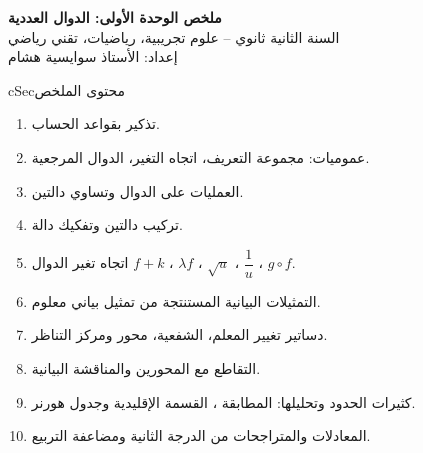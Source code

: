 \documentclass[12pt,a4paper]{article}
\newenvironment{BOX}[2]{\begin{otherlanguage}{english}\begin{arbox}{#1}{#2}}{\end{arbox}\end{otherlanguage}}
\newenvironment{LTR}{\begin{otherlanguage}{english}}{\end{otherlanguage}}
\begin{document}
\begin{LTR}
\begin{tcolorbox}[enhanced,colback=cSec,colframe=cSec,arc=3mm,halign=center,
  boxrule=0pt,top=10pt,bottom=10pt,before upper={\selectlanguage{arabic}}]
{\color{white}\Huge\bfseries ملخص الوحدة الأولى: الدوال العددية}\\[6pt]
{\color{white}\large السنة الثانية ثانوي -- علوم تجريبية، رياضيات، تقني رياضي}\\[4pt]
{\color{white!85!cSec}\normalsize إعداد: الأستاذ سوايسية هشام}
\end{tcolorbox}
\end{LTR}

\begin{BOX}{cSec}{محتوى الملخص}
\begin{enumerate}
\item تذكير بقواعد الحساب.
\item عموميات: مجموعة التعريف، اتجاه التغير، الدوال المرجعية.
\item العمليات على الدوال وتساوي دالتين.
\item تركيب دالتين وتفكيك دالة.
\item اتجاه تغير الدوال $f+k$ ، $\lambda f$ ، $\sqrt u$ ، $\dfrac1u$ ، $g\circ f$.
\item التمثيلات البيانية المستنتجة من تمثيل بياني معلوم.
\item دساتير تغيير المعلم، الشفعية، محور ومركز التناظر.
\item التقاطع مع المحورين والمناقشة البيانية.
\item كثيرات الحدود وتحليلها: المطابقة ، القسمة الإقليدية وجدول هورنر.
\item المعادلات والمتراجحات من الدرجة الثانية ومضاعفة التربيع.
\end{enumerate}
\end{BOX}

\end{document}
